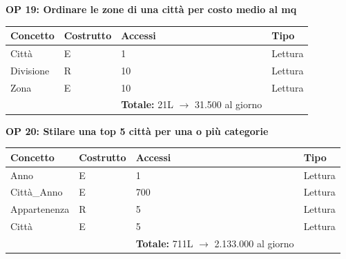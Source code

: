 \documentclass[a4paper,12pt]{report}
\begin{document}
            \textbf{OP 19: Ordinare le zone di una città per costo medio al mq}
        	\begin{table}[H]
            \centering
             \begin{tabular}{llll}
             \rowcolor{yellow!20} \textbf{Concetto} & \textbf{Costrutto} & \textbf{Accessi} & \textbf{Tipo}\\ [0.5ex] 
             \hline
             Città & E & 1 & Lettura \\ 
             Divisione & R & 10 & Lettura \\ 
             Zona & E & 10 & Lettura \\ 
             \hline
                \rowcolor{yellow!20} &   & \textbf{Totale:} 21L $\rightarrow$ 31.500 al giorno &  \\ [1ex] 
             
             \end{tabular}
            \end{table}

            \textbf{OP 20: Stilare una top 5 città per una o più categorie}
        	\begin{table}[H]
            \centering
             \begin{tabular}{llll}
             \rowcolor{yellow!20} \textbf{Concetto} & \textbf{Costrutto} & \textbf{Accessi} & \textbf{Tipo}\\ [0.5ex] 
             \hline
             Anno & E & 1 & Lettura \\ 
             Città\_Anno & E & 700 & Lettura \\ 
             Appartenenza & R & 5 & Lettura \\ 
             Città & E & 5 & Lettura \\ 
             \hline
                \rowcolor{yellow!20} &   & \textbf{Totale:} 711L $\rightarrow$ 2.133.000 al giorno &  \\ [1ex] 
             
             \end{tabular}
            \end{table}
\end{document}
